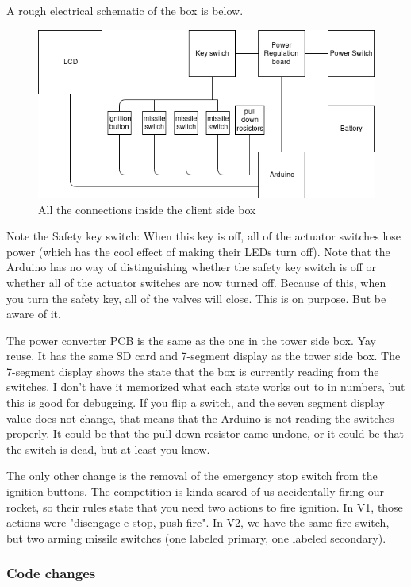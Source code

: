 \documentclass[11pt]{article}
\begin{document}
A rough electrical schematic of the box is below.

\begin{figure}[htbp]
\centering
\includegraphics[width=.9\linewidth]{./images/csb_full.png}
\caption{\label{fig:org299422c}
All the connections inside the client side box}
\end{figure}

Note the Safety key switch: When this key is off, all of the actuator switches
lose power (which has the cool effect of making their LEDs turn off). Note that
the Arduino has no way of distinguishing whether the safety key switch is off or
whether all of the actuator switches are now turned off. Because of this, when
you turn the safety key, all of the valves will close. This is on purpose. But
be aware of it.

The power converter PCB is the same as the one in the tower side box. Yay
reuse. It has the same SD card and 7-segment display as the tower side box. The
7-segment display shows the state that the box is currently reading from the
switches. I don't have it memorized what each state works out to in numbers, but
this is good for debugging. If you flip a switch, and the seven segment display
value does not change, that means that the Arduino is not reading the switches
properly. It could be that the pull-down resistor came undone, or it could be
that the switch is dead, but at least you know.

The only other change is the removal of the emergency stop switch from the
ignition buttons. The competition is kinda scared of us accidentally firing our
rocket, so their rules state that you need two actions to fire ignition. In V1,
those actions were "disengage e-stop, push fire". In V2, we have the same fire
switch, but two arming missile switches (one labeled primary, one labeled
secondary). 

\subsubsection{Code changes}
\label{sec:org47e6b6c}
\end{document}
